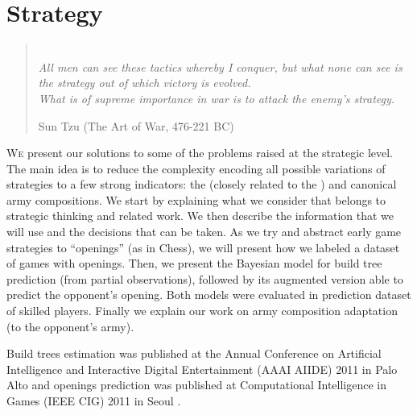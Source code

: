 \chapter{Strategy}
\label{chapter:strategy}
\begin{quotation}
\\
\textit{All men can see these tactics whereby I conquer, but what none can see is the strategy out of which victory is evolved.}\\
\textit{What is of supreme importance in war is to attack the enemy's strategy.}\\
\begin{flushright}Sun Tzu (The Art of War, 476-221 BC)\end{flushright}
\end{quotation}


\lettrine{W}e present our solutions to some of the problems raised at the strategic level. The main idea is to reduce the complexity encoding all possible variations of strategies to a few strong indicators: the  (closely related to the ) and canonical army compositions. 
We start by explaining what we consider that belongs to strategic thinking and related work. We then describe the information that we will use and the decisions that can be taken. As we try and abstract early game strategies to ``openings'' (as in Chess), we will present how we labeled a dataset of games with openings. Then, we present the Bayesian model for build tree prediction (from partial observations), followed by its augmented version able to predict the opponent's opening. Both models were evaluated in prediction dataset of skilled players. Finally we explain our work on army composition adaptation (to the opponent's army).

Build trees estimation was published at the Annual Conference on Artificial Intelligence and Interactive Digital Entertainment (AAAI AIIDE) 2011 in Palo Alto \citep{SYNNAEVE:StratPred} and openings prediction was published at Computational Intelligence in Games (IEEE CIG) 2011 in Seoul \citep{SYNNAEVE:OpeningPred}.



